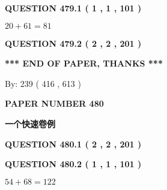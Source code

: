 \documentclass{ctexart}
\begin{document}
   
  
\vspace{0.2in}
  
{\textbf{\Large{QUESTION
479.1 
 ( 1 , 1 , 101 )
}}}
  
  
 
 

$ %
20 +  %
61=   %
81$
 
 
  
\vspace{0.2in}
  
{\textbf{\Large{QUESTION
479.2 
 ( 2 , 2 , 201 )
}}}
  
  
   
   
 \vspace{0.2in}
 
   
   
   
   
\vspace{1.0in} 
{\textbf{\large{ *** END OF PAPER, THANKS *** }}} 
   
   
\hspace{1.0in} By: 
 239 ( 416 ,  613 )
   
   
   
   
\newpage 
\setcounter{page}{ 
   480001 } 
   
   
   
   
 {\textbf{ \Large{ PAPER NUMBER  480  }}}
   
   
\vspace{0.2in}
   
   
   
   
   
   
 \vspace{0.2in}
{\LARGE {\textbf{ 一个快速卷例}}}
   
   
  
\vspace{0.2in}
  
{\textbf{\Large{QUESTION
480.1 
 ( 2 , 2 , 201 )
}}}
  
  
  
\vspace{0.2in}
  
{\textbf{\Large{QUESTION
480.2 
 ( 1 , 1 , 101 )
}}}
  
  
 
 

$ %
54 +  %
68=   %
122$
 
 
   
\end{document}
